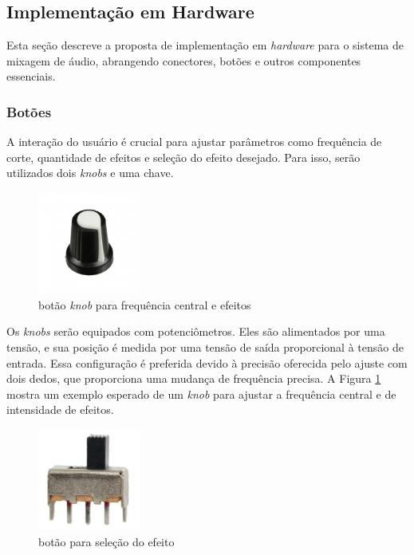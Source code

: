 \subsection{Implementação em Hardware}

Esta seção descreve a proposta de implementação em \textit{hardware} para o sistema de mixagem de áudio, abrangendo conectores, botões e outros componentes essenciais.

\subsubsection*{Botões}
A interação do usuário é crucial para ajustar parâmetros como frequência de corte, quantidade de efeitos e seleção do efeito desejado. Para isso, serão utilizados dois \textit{knobs} e uma chave.


\begin{figure}[h]
    \centering
    \includegraphics[width=0.3\textwidth]{figuras/fig61.jpg}
    \caption{botão \textit{knob} para frequência central e efeitos \cite{robocore}}
    \label{fig61}
\end{figure}

Os \textit{knobs} serão equipados com potenciômetros. Eles são alimentados por uma tensão, e sua posição é medida por uma tensão de saída proporcional à tensão de entrada. Essa configuração é preferida devido à precisão oferecida pelo ajuste com dois dedos, que proporciona uma mudança de frequência precisa. A Figura \ref{fig61} mostra um exemplo esperado de um \textit{knob} para ajustar a frequência central e de intensidade de efeitos.

\begin{figure}[h]
    \centering
    \includegraphics[width=0.3\textwidth]{figuras/fig62.png}
    \caption{botão para seleção do efeito \cite{evea}}
    \label{fig62}
\end{figure}

